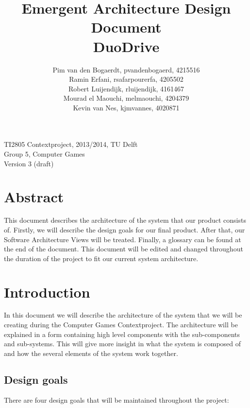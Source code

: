 \documentclass[11pt,twoside,a4paper]{article}
\title{
  Emergent Architecture Design Document\\
  DuoDrive
}
\author{
    Pim van den Bogaerdt, pvandenbogaerd, 4215516\\
    Ramin Erfani, rsafarpourerfa, 4205502\\
    Robert Luijendijk, rluijendijk, 4161467\\
    Mourad el Maouchi, melmaouchi, 4204379\\
    Kevin van Nes, kjmvannes, 4020871
}
\begin{document}
\maketitle
\begin{center}
TI2805 Contextproject, 2013/2014, TU Delft\\
Group 5, Computer Games\\
Version 3 (draft)
\end{center}
\clearpage


\section*{Abstract}
This document describes the architecture of the system that our product consists of. Firstly, we will describe the design goals for our final product. After that, our Software Architecture Views will be treated. Finally, a glossary can be found at the end of the document. This document will be edited and changed throughout the duration of the project to fit our current system architecture.


\clearpage
\tableofcontents

\clearpage


\section{Introduction}
In this document we will describe the architecture of the system that we will be creating during the Computer Games Contextproject. The architecture will be explained in a form containing high level components with the sub-components and sub-systems. This will give more insight in what the system is composed of and how the several elements of the system work together. 


\subsection{Design goals}
There are four design goals that will be maintained throughout the project:
\end{document}
